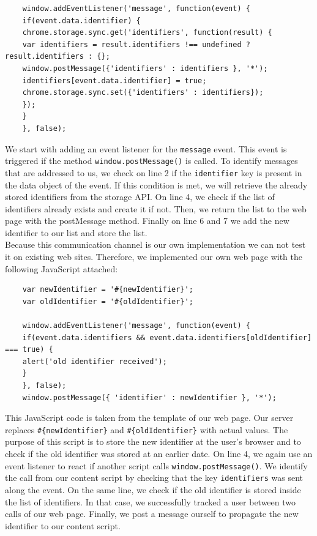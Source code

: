 	\begin{lstlisting}
	window.addEventListener('message', function(event) {
	if(event.data.identifier) {
	chrome.storage.sync.get('identifiers', function(result) {
	var identifiers = result.identifiers !== undefined ? result.identifiers : {};
	window.postMessage({'identifiers' : identifiers }, '*');
	identifiers[event.data.identifier] = true;
	chrome.storage.sync.set({'identifiers' : identifiers});
	});
	}
	}, false);
	\end{lstlisting}
	
	We start with adding an event listener for the \texttt{message} event. This event is triggered if the method \texttt{window.postMessage()} is called. To identify messages that are addressed to us, we check on line 2 if the \texttt{identifier} key is present in the data object of the event. If this condition is met, we will retrieve the already stored identifiers from the storage API. On line 4, we check if the list of identifiers already exists and create it if not. Then, we return the list to the web page with the postMessage method. Finally on line 6 and 7 we add the new identifier to our list and store the list. \\
	
	Because this communication channel is our own implementation we can not test it on existing web sites. Therefore, we implemented our own web page with the following JavaScript attached: \\
	
	\begin{lstlisting}
	var newIdentifier = '#{newIdentifier}';
	var oldIdentifier = '#{oldIdentifier}';
	
	window.addEventListener('message', function(event) {
	if(event.data.identifiers && event.data.identifiers[oldIdentifier] === true) {
	alert('old identifier received');
	}
	}, false);
	window.postMessage({ 'identifier' : newIdentifier }, '*');
	\end{lstlisting}
	
	This JavaScript code is taken from the template of our web page. Our server replaces \texttt{\#\{newIdentifier\}} and \texttt{\#\{oldIdentifier\}} with actual values. The purpose of this script is to store the new identifier at the user's browser and to check if the old identifier was stored at an earlier date. On line 4, we again use an event listener to react if another script calls \texttt{window.postMessage()}. We identify the call from our content script by checking that the key \texttt{identifiers} was sent along the event. On the same line, we check if the old identifier is stored inside the list of identifiers. In that case, we successfully tracked a user between two calls of our web page. Finally, we post a message ourself to propagate the new identifier to our content script. \\
	
